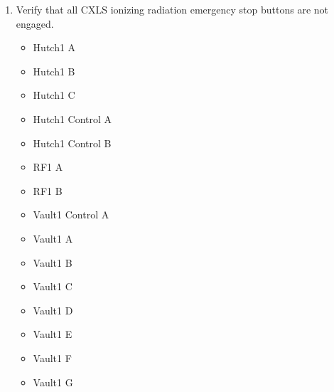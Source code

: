 \documentclass[letterpaper,10pt,english]{sphinxmanual}
\begin{document}
\begin{enumerate}
\begin{itemize}
\item {} 
\sphinxAtStartPar
Hutch\sphinxhyphen{}1 Control Ionizing Radiation Interlock protocase beacon.

\end{itemize}

\item {} 
\sphinxAtStartPar
Verify that all CXLS ionizing radiation emergency stop buttons are not engaged.
\begin{itemize}
\item {} 
\sphinxAtStartPar
Hutch\sphinxhyphen{}1 A

\item {} 
\sphinxAtStartPar
Hutch\sphinxhyphen{}1 B

\item {} 
\sphinxAtStartPar
Hutch\sphinxhyphen{}1 C

\item {} 
\sphinxAtStartPar
Hutch\sphinxhyphen{}1 Control A

\item {} 
\sphinxAtStartPar
Hutch\sphinxhyphen{}1 Control B

\item {} 
\sphinxAtStartPar
RF\sphinxhyphen{}1 A

\item {} 
\sphinxAtStartPar
RF\sphinxhyphen{}1 B

\item {} 
\sphinxAtStartPar
Vault\sphinxhyphen{}1 Control A

\item {} 
\sphinxAtStartPar
Vault\sphinxhyphen{}1 A

\item {} 
\sphinxAtStartPar
Vault\sphinxhyphen{}1 B

\item {} 
\sphinxAtStartPar
Vault\sphinxhyphen{}1 C

\item {} 
\sphinxAtStartPar
Vault\sphinxhyphen{}1 D

\item {} 
\sphinxAtStartPar
Vault\sphinxhyphen{}1 E

\item {} 
\sphinxAtStartPar
Vault\sphinxhyphen{}1 F

\item {} 
\sphinxAtStartPar
Vault\sphinxhyphen{}1 G

\end{itemize}

\end{enumerate}
\end{document}
